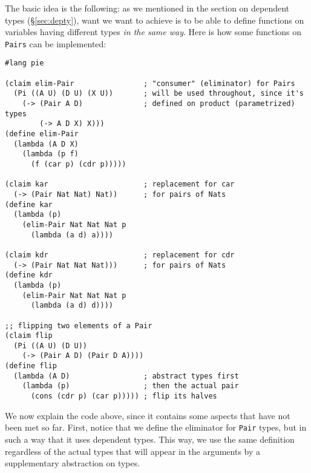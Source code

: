 The basic idea is the following: as we mentioned in the section on
dependent types (\S\ref{sec:depty}), want we want to achieve is to be able
to define functions on variables having different types \emph{in the same way}.
Here is how some functions on \texttt{Pairs} can be implemented:
{
  \small
\begin{verbatim}
#lang pie

(claim elim-Pair                ; "consumer" (eliminator) for Pairs
  (Pi ((A U) (D U) (X U))       ; will be used throughout, since it's
    (-> (Pair A D)              ; defined on product (parametrized) types
        (-> A D X) X)))
(define elim-Pair
  (lambda (A D X)
    (lambda (p f)
      (f (car p) (cdr p)))))

(claim kar                      ; replacement for car
  (-> (Pair Nat Nat) Nat))      ; for pairs of Nats
(define kar
  (lambda (p)
    (elim-Pair Nat Nat Nat p
      (lambda (a d) a))))

(claim kdr                      ; replacement for cdr
  (-> (Pair Nat Nat Nat)))      ; for pairs of Nats
(define kdr
  (lambda (p)
    (elim-Pair Nat Nat Nat p
      (lambda (a d) d))))

;; flipping two elements of a Pair
(claim flip
  (Pi ((A U) (D U))
    (-> (Pair A D) (Pair D A))))
(define flip
  (lambda (A D)                 ; abstract types first
    (lambda (p)                 ; then the actual pair
      (cons (cdr p) (car p))))) ; flip its halves
\end{verbatim}
}

We now explain the code above, since it contains some aspects that have not
been met so far. First, notice that we define the eliminator for \texttt{Pair}
types\footnotemark, but in such a way that it uses dependent types. This way,
we use the same definition regardless of the actual types that will appear in
the arguments by a supplementary abstraction on types.

